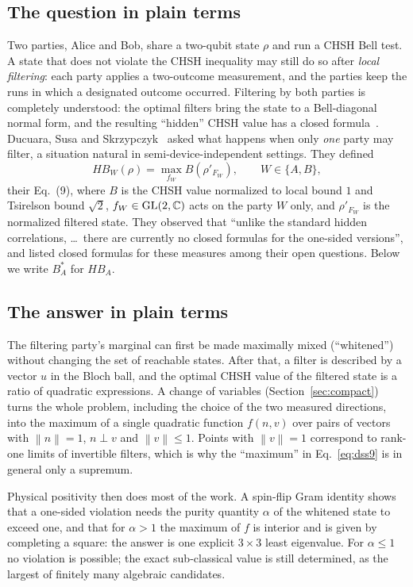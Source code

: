 \documentclass[11pt,a4paper]{article}
\theoremstyle{remark}\newtheorem{remark}[theorem]{Remark}
\newcommand{\norm}[1]{\left\lVert#1\right\rVert}
\begin{document}
\subsection{The question in plain terms}

Two parties, Alice and Bob, share a two-qubit state $\rho$ and run a CHSH
Bell test. A state that does not violate the CHSH inequality may still do
so after \emph{local filtering}: each party applies a two-outcome
measurement, and the parties keep the runs in which a designated outcome
occurred. Filtering by both parties is completely understood: the
optimal filters bring the state to a Bell-diagonal normal form, and the
resulting ``hidden'' CHSH value has a closed formula~\cite{verstraetewolf,
klm,ducuara}. Ducuara, Susa and Skrzypczyk~\cite{ducuara} asked what
happens when only \emph{one} party may filter, a situation natural in
semi-device-independent settings. They defined
\begin{equation}
 HB_W(\rho)=\max_{f_W}B(\rho'_{F_W}),\qquad W\in\{A,B\},
 \label{eq:dss9}
\end{equation}
their Eq.~(9), where $B$ is the CHSH value normalized to local bound $1$
and Tsirelson bound $\sqrt2$, $f_W\in\mathrm{GL}(2,\mathbb C)$ acts on the party
$W$ only, and $\rho'_{F_W}$ is the normalized filtered state. They
observed that ``unlike the standard hidden correlations, \dots\ there are
currently no closed formulas for the one-sided versions'', and listed
closed formulas for these measures among their open questions. Below we
write $B_A^*$ for $HB_A$.

\subsection{The answer in plain terms}

The filtering party's marginal can first be made maximally mixed
(``whitened'') without changing the set of reachable states. After that,
a filter is described by a vector $u$ in the Bloch ball, and the optimal
CHSH value of the filtered state is a ratio of quadratic expressions. A
change of variables (Section~\ref{sec:compact}) turns the whole problem,
including the choice of the two measured directions, into the maximum of a
single quadratic function $f(n,v)$ over pairs of vectors with $\norm n=1$,
$n\perp v$ and $\norm v\le1$. Points with $\norm v=1$ correspond to
rank-one limits of invertible filters, which is why the ``maximum'' in
Eq.~\eqref{eq:dss9} is in general only a supremum.

Physical positivity then does most of the work. A spin-flip Gram identity
shows that a one-sided violation needs the purity quantity $\alpha$ of
the whitened state to exceed one, and that for $\alpha>1$ the maximum of
$f$ is interior and is given by completing a square: the answer is one
explicit $3\times3$ least eigenvalue. For $\alpha\le1$ no violation is
possible; the exact sub-classical value is still determined, as the largest
of finitely many algebraic candidates.
\end{document}
